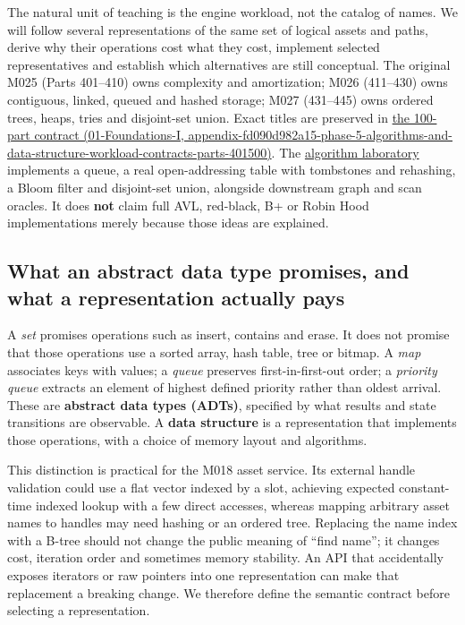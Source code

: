 The natural unit of teaching is the engine workload, not the catalog of names. We will follow several representations of the same set of logical assets and paths, derive why their operations cost what they cost, implement selected representatives and establish which alternatives are still conceptual. The original M025 (Parts 401--410) owns complexity and amortization; M026 (411--430) owns contiguous, linked, queued and hashed storage; M027 (431--445) owns ordered trees, heaps, tries and disjoint-set union. Exact titles are preserved in \href{../01-Foundations-I/main.pdf\#nameddest=appendix-fd090d982a15-phase-5-algorithms-and-data-structure-workload-contracts-parts-401500}{the 100-part contract (01-Foundations-I, appendix-fd090d982a15-phase-5-algorithms-and-data-structure-workload-contracts-parts-401500)}. The \href{tools/labs/phase5_algorithm_workload_lab.cpp}{algorithm laboratory} implements a queue, a real open-addressing table with tombstones and rehashing, a Bloom filter and disjoint-set union, alongside downstream graph and scan oracles. It does \textbf{not} claim full AVL, red-black, B+ or Robin Hood implementations merely because those ideas are explained.

\subsection{What an abstract data type promises, and what a representation actually pays}\label{05-engine-i-ch007-what-an-abstract-data-type-promises-and-what-a-representation-actually-pays}

A \emph{set} promises operations such as insert, contains and erase. It does not promise that those operations use a sorted array, hash table, tree or bitmap. A \emph{map} associates keys with values; a \emph{queue} preserves first-in-first-out order; a \emph{priority queue} extracts an element of highest defined priority rather than oldest arrival. These are \textbf{abstract data types (ADTs)}, specified by what results and state transitions are observable. A \textbf{data structure} is a representation that implements those operations, with a choice of memory layout and algorithms.

This distinction is practical for the M018 asset service. Its external handle validation could use a flat vector indexed by a slot, achieving expected constant-time indexed lookup with a few direct accesses, whereas mapping arbitrary asset names to handles may need hashing or an ordered tree. Replacing the name index with a B-tree should not change the public meaning of ``find name''; it changes cost, iteration order and sometimes memory stability. An API that accidentally exposes iterators or raw pointers into one representation can make that replacement a breaking change. We therefore define the semantic contract before selecting a representation.

